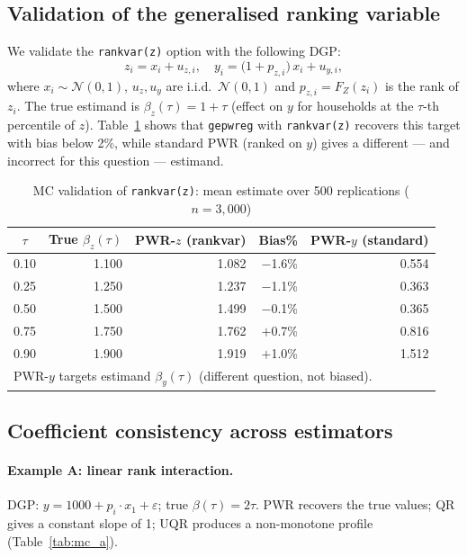 \documentclass[12pt,a4paper]{article}
\theoremstyle{definition}
\begin{document}
\subsection{Validation of the generalised ranking variable}
\label{sec:mc:rankvar}

We validate the \texttt{rankvar(z)} option with the following DGP:
\[
z_i = x_i + u_{z,i},\quad
y_i = \bigl(1 + p_{z,i}\bigr)\,x_i + u_{y,i},
\]
where $x_i\sim\mathcal{N}(0,1)$, $u_z,u_y$ are i.i.d.\ $\mathcal{N}(0,1)$
and $p_{z,i}=F_Z(z_i)$ is the rank of $z_i$. The true estimand is
$\beta_z(\tau) = 1+\tau$ (effect on $y$ for households at the $\tau$-th
percentile of $z$). Table~\ref{tab:mc_rankvar} shows that
\texttt{gepwreg} with \texttt{rankvar(z)} recovers this target with
bias below 2\%, while standard PWR (ranked on $y$) gives a
different --- and incorrect for this question --- estimand.

\begin{table}[htbp]\centering\small
\caption{MC validation of \texttt{rankvar(z)}: mean estimate over 500 replications
($n=3{,}000$)}
\label{tab:mc_rankvar}
\begin{tabular}{crrrr}
\toprule
$\tau$ & True $\beta_z(\tau)$ &
PWR-$z$ (rankvar) & Bias\% &
PWR-$y$ (standard) \\\midrule
0.10 & 1.100 & 1.082 & $-$1.6\% & 0.554 \\
0.25 & 1.250 & 1.237 & $-$1.1\% & 0.363 \\
0.50 & 1.500 & 1.499 & $-$0.1\% & 0.365 \\
0.75 & 1.750 & 1.762 & $+$0.7\% & 0.816 \\
0.90 & 1.900 & 1.919 & $+$1.0\% & 1.512 \\\midrule
\multicolumn{5}{l}{\footnotesize
PWR-$y$ targets estimand $\beta_y(\tau)$ (different question, not biased).}
\end{tabular}
\end{table}

\subsection{Coefficient consistency across estimators}

\paragraph{Example A: linear rank interaction.}
DGP: $y = 1000 + p_i \cdot x_1 + \varepsilon$; true $\beta(\tau)=2\tau$.
PWR recovers the true values; QR gives a constant slope of 1; UQR
produces a non-monotone profile (Table~\ref{tab:mc_a}).
\end{document}
